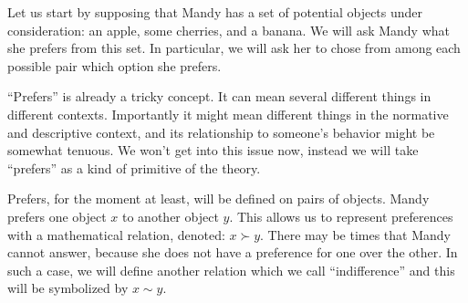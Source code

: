Let us start by supposing that Mandy has a set of potential objects under consideration: an apple, some cherries, and a banana.  We will ask Mandy what she prefers from this set.  In particular, we will ask her to chose from among each possible pair which option she prefers.  

``Prefers'' is already a tricky concept.  It can mean several different things in different contexts.  Importantly it might mean different things in the normative and descriptive context, and its relationship to someone's behavior might be somewhat tenuous.  We won't get into this issue now, instead we will take ``prefers'' as a kind of primitive of the theory.

Prefers, for the moment at least, will be defined on pairs of objects.  Mandy prefers one object $x$ to another object $y$.  This allows us to represent preferences with a mathematical relation, denoted: $x \succ y$. There may be times that Mandy cannot answer, because she does not have a preference for one over the other.  In such a case, we will define another relation which we call ``indifference'' and this will be symbolized by $x \sim y$.


